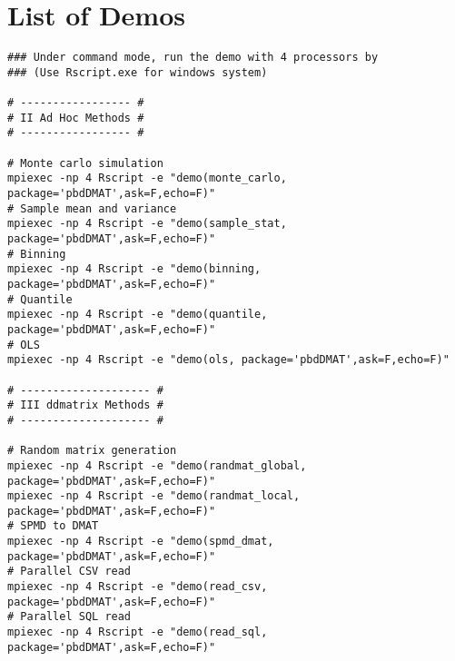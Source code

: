 \section{List of Demos}

\begin{lstlisting}[title=Shell Script]
### Under command mode, run the demo with 4 processors by
### (Use Rscript.exe for windows system)

# ----------------- #
# II Ad Hoc Methods #
# ----------------- #

# Monte carlo simulation
mpiexec -np 4 Rscript -e "demo(monte_carlo, package='pbdDMAT',ask=F,echo=F)"
# Sample mean and variance
mpiexec -np 4 Rscript -e "demo(sample_stat, package='pbdDMAT',ask=F,echo=F)"
# Binning
mpiexec -np 4 Rscript -e "demo(binning, package='pbdDMAT',ask=F,echo=F)"
# Quantile
mpiexec -np 4 Rscript -e "demo(quantile, package='pbdDMAT',ask=F,echo=F)"
# OLS
mpiexec -np 4 Rscript -e "demo(ols, package='pbdDMAT',ask=F,echo=F)"

# -------------------- #
# III ddmatrix Methods #
# -------------------- #

# Random matrix generation
mpiexec -np 4 Rscript -e "demo(randmat_global, package='pbdDMAT',ask=F,echo=F)"
mpiexec -np 4 Rscript -e "demo(randmat_local, package='pbdDMAT',ask=F,echo=F)"
# SPMD to DMAT
mpiexec -np 4 Rscript -e "demo(spmd_dmat, package='pbdDMAT',ask=F,echo=F)"
# Parallel CSV read
mpiexec -np 4 Rscript -e "demo(read_csv, package='pbdDMAT',ask=F,echo=F)"
# Parallel SQL read
mpiexec -np 4 Rscript -e "demo(read_sql, package='pbdDMAT',ask=F,echo=F)"
\end{lstlisting}